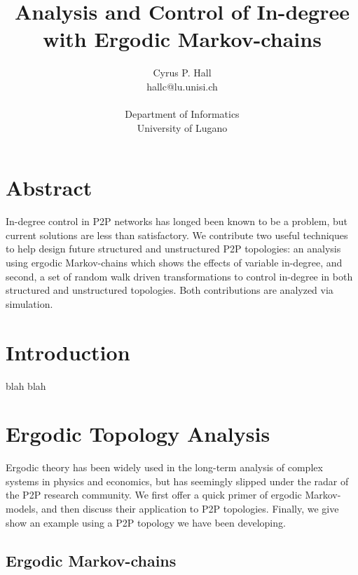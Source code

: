 \documentclass[a4paper,11pt,twocolumn]{article}
\begin{document}
\title{Analysis and Control of In-degree with Ergodic Markov-chains}
\author{Cyrus P. Hall\\
  hallc@lu.unisi.ch\\
  \\
  Department of Informatics\\
  University of Lugano\\
}
\maketitle

\section*{Abstract}
In-degree control in P2P networks has longed been known to be a problem, but
current solutions are less than satisfactory.  We contribute two useful
techniques to help design future structured and unstructured P2P topologies: an
analysis using ergodic Markov-chains which shows the effects of variable
in-degree, and second, a set of random walk driven transformations to control
in-degree in both structured and unstructured topologies.  Both contributions
are analyzed via simulation.

\section{Introduction}
blah blah

\section{Ergodic Topology Analysis}

Ergodic theory has been widely used in the long-term analysis of complex
systems in physics and economics, but has seemingly slipped under the radar of
the P2P research community.  We first offer a quick primer of ergodic
Markov-models, and then discuss their application to P2P topologies.  Finally,
we give show an example using a P2P topology we have been developing. 

\subsection{Ergodic Markov-chains}
\end{document}
